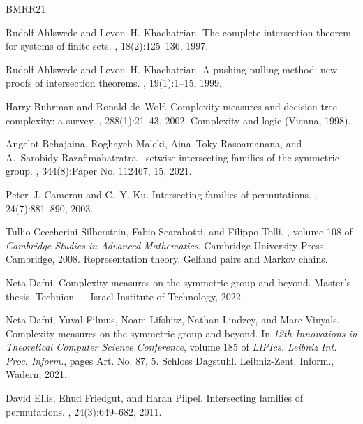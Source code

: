 \documentclass[10pt,a4paper]{article}
\theoremstyle{definition}
\begin{document}
\newcommand{\etalchar}[1]{$^{#1}$}
\begin{thebibliography}{BMRR21}

Rudolf Ahlswede and Levon~H. Khachatrian.
\newblock The complete intersection theorem for systems of finite sets.
, 18(2):125--136, 1997.

Rudolf Ahlswede and Levon~H. Khachatrian.
\newblock A pushing-pulling method: new proofs of intersection theorems.
, 19(1):1--15, 1999.

Harry Buhrman and Ronald de~Wolf.
\newblock Complexity measures and decision tree complexity: a survey.
, 288(1):21--43, 2002.
\newblock Complexity and logic (Vienna, 1998).

Angelot Behajaina, Roghayeh Maleki, Aina~Toky Rasoamanana, and A.~Sarobidy
  Razafimahatratra.
-setwise intersecting families of the symmetric group.
, 344(8):Paper No. 112467, 15, 2021.

Peter~J. Cameron and C.~Y. Ku.
\newblock Intersecting families of permutations.
, 24(7):881--890, 2003.

Tullio Ceccherini-Silberstein, Fabio Scarabotti, and Filippo Tolli.
, volume 108 of {\em
  Cambridge Studies in Advanced Mathematics}.
\newblock Cambridge University Press, Cambridge, 2008.
\newblock Representation theory, Gelfand pairs and Markov chains.

Neta Dafni.
\newblock Complexity measures on the symmetric group and beyond.
\newblock Master's thesis, Technion --- Israel Institute of Technology, 2022.

\bibitem[DFL{\etalchar{+}}21]{DFLLV}
Neta Dafni, Yuval Filmus, Noam Lifshitz, Nathan Lindzey, and Marc Vinyals.
\newblock Complexity measures on the symmetric group and beyond.
\newblock In {\em 12th {I}nnovations in {T}heoretical {C}omputer {S}cience
  {C}onference}, volume 185 of {\em LIPIcs. Leibniz Int. Proc. Inform.}, pages
  Art. No. 87, 5. Schloss Dagstuhl. Leibniz-Zent. Inform., Wadern, 2021.

David Ellis, Ehud Friedgut, and Haran Pilpel.
\newblock Intersecting families of permutations.
, 24(3):649--682, 2011.


\end{thebibliography}
\end{document}

